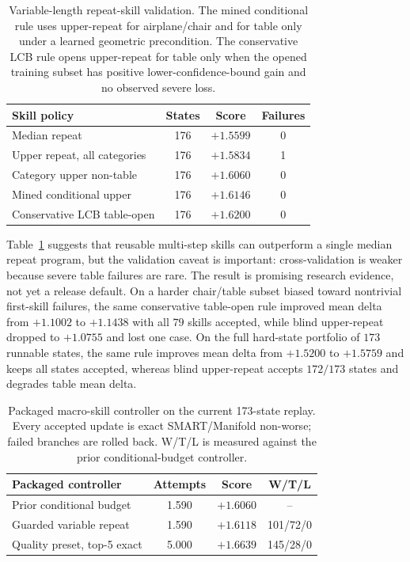 \documentclass[10pt,twocolumn,letterpaper]{article}
\begin{document}
\begin{table}[t]
\centering
\small
\begin{tabularx}{\linewidth}{lccc}
\toprule
Skill policy & States & Score & Failures \\
\midrule
Median repeat & 176 & $+1.5599$ & 0 \\
Upper repeat, all categories & 176 & $+1.5834$ & 1 \\
Category upper non-table & 176 & $+1.6060$ & 0 \\
Mined conditional upper & 176 & $+1.6146$ & 0 \\
Conservative LCB table-open & 176 & $+1.6200$ & 0 \\
\bottomrule
\end{tabularx}
\caption{Variable-length repeat-skill validation.  The mined conditional rule
uses upper-repeat for airplane/chair and for table only under a learned
geometric precondition.  The conservative LCB rule opens upper-repeat for table
only when the opened training subset has positive lower-confidence-bound gain
and no observed severe loss.}
\label{tab:skills}
\end{table}

Table~\ref{tab:skills} suggests that reusable multi-step skills can outperform
a single median repeat program, but the validation caveat is important:
cross-validation is weaker because severe table failures are rare.  The result
is promising research evidence, not yet a release default.
On a harder chair/table subset biased toward nontrivial first-skill failures,
the same conservative table-open rule improved mean delta from $+1.1002$ to
$+1.1438$ with all $79$ skills accepted, while blind upper-repeat dropped to
$+1.0755$ and lost one case.
On the full hard-state portfolio of $173$ runnable states, the same rule
improves mean delta from $+1.5200$ to $+1.5759$ and keeps all states accepted,
whereas blind upper-repeat accepts $172/173$ states and degrades table mean
delta.

\begin{table}[t]
\centering
\small
\begin{tabularx}{\linewidth}{lccc}
\toprule
Packaged controller & Attempts & Score & W/T/L \\
\midrule
Prior conditional budget & 1.590 & $+1.6060$ & -- \\
Guarded variable repeat & 1.590 & $+1.6118$ & 101/72/0 \\
Quality preset, top-5 exact & 5.000 & $+1.6639$ & 145/28/0 \\
\bottomrule
\end{tabularx}
\caption{Packaged macro-skill controller on the current 173-state replay.
Every accepted update is exact SMART/Manifold non-worse; failed branches are
rolled back.  W/T/L is measured against the prior conditional-budget
controller.}
\label{tab:packaged_macro}
\end{table}
\end{document}
